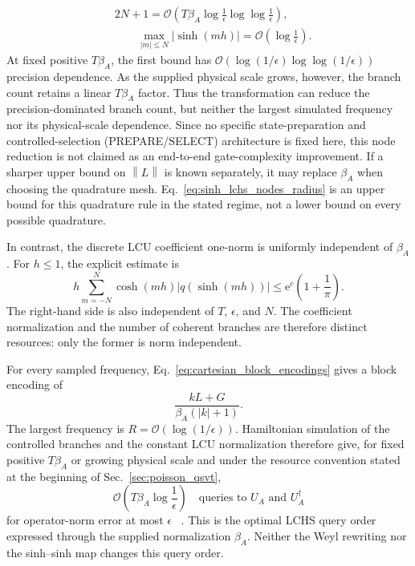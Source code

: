 \documentclass[aps,pra,reprint,floatfix,unsortedaddress,superscriptaddress]{revtex4-2}
\newcommand{\norm}[1]{\left\lVert#1\right\rVert}
\newcommand{\abs}[1]{\left\lvert#1\right\rvert}
\newcommand{\Ocal}{\mathcal{O}}
\begin{document}
\begin{align}
    &2N+1=\Ocal\!\left(
        T\beta_A
        \log\frac{1}{\epsilon}
        \log\log\frac{1}{\epsilon}
    \right),
    \nonumber\\
    &\qquad \max_{\abs{m}\leq N}\abs{\sinh(mh)}
    =\Ocal\!\left(\log\frac{1}{\epsilon}\right).
    \label{eq:sinh_lchs_nodes_radius}
\end{align}
At fixed positive $T\beta_A$, the first bound has
$\Ocal(\log(1/\epsilon)\log\log(1/\epsilon))$ precision dependence.
As the supplied physical scale grows, however, the branch count retains
a linear $T\beta_A$ factor.  Thus the transformation
can reduce the precision-dominated branch count, but neither the largest
simulated frequency nor its physical-scale dependence.  Since no specific
state-preparation and controlled-selection (PREPARE/SELECT)
architecture is fixed here, this node reduction
is not claimed as an end-to-end gate-complexity improvement.
If a sharper upper bound on $\norm{L}$ is known separately, it may
replace $\beta_A$ when choosing the quadrature mesh.
Eq.~\eqref{eq:sinh_lchs_nodes_radius} is an upper bound for this
quadrature rule in the stated regime, not a lower bound on every
possible quadrature.

In contrast, the discrete LCU coefficient one-norm is uniformly
independent of $\beta_A$.  For $h\leq1$, the explicit estimate is
\begin{equation}
    h\sum_{m=-N}^{N}
    \cosh(mh)\abs{q(\sinh(mh))}
    \leq \mathrm e^c\left(1+\frac{1}{\pi}\right).
    \label{eq:sinh_lchs_normalization_bound}
\end{equation}
The right-hand side is also independent of $T$, $\epsilon$, and $N$.
The coefficient normalization and the number of coherent branches are
therefore distinct resources: only the former is norm independent.

For every sampled frequency, Eq.~\eqref{eq:cartesian_block_encodings}
gives a block encoding of
\begin{equation}
    \frac{kL+G}{\beta_A(\abs{k}+1)}.
    \label{eq:lchs_branch_normalization}
\end{equation}
The largest frequency is $R=\Ocal(\log(1/\epsilon))$.  Hamiltonian
simulation of the controlled branches and the constant LCU
normalization therefore give, for fixed positive $T\beta_A$ or growing
physical scale and under the resource convention stated at the
beginning of Sec.~\ref{sec:poisson_qsvt},
\begin{equation}
    \Ocal\!\left(
        T\beta_A\log\frac{1}{\epsilon}
    \right)
    \quad\text{queries to }U_A\text{ and }U_A^\dagger
    \label{eq:optimal_lchs_query_complexity}
\end{equation}
for operator-norm error at most $\epsilon$
~\cite{PhysRevLett.114.090502,
low2017hamiltoniansimulationuniformspectral,
low2025optimalquantumsimulationlinear}.  This is the optimal LCHS query
order expressed through the supplied normalization $\beta_A$.  Neither
the Weyl rewriting nor the sinh--sinh map changes this query order.
\end{document}
